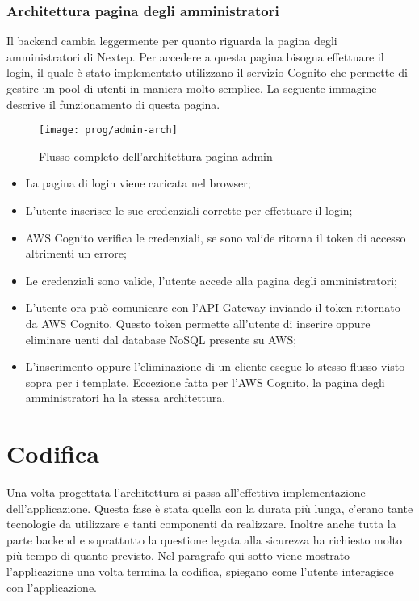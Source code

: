 \subsubsection{Architettura pagina degli amministratori}
Il backend cambia leggermente per quanto riguarda la pagina degli amministratori di Nextep. Per accedere a questa pagina bisogna effettuare il login, il quale è stato implementato utilizzano il servizio Cognito che permette di gestire un pool di utenti in maniera molto semplice. La seguente immagine descrive il funzionamento di questa pagina. 
\begin{figure}[!h] 
	\centering 
	\texttt{[image: prog/admin-arch]} 
	\caption{Flusso completo dell'architettura pagina admin}
\end{figure} 
\begin{itemize}
	\item La pagina di login viene caricata nel browser;
	\item L'utente inserisce le sue credenziali corrette per effettuare il login;
	\item AWS Cognito verifica le credenziali, se sono valide ritorna il token di accesso altrimenti un errore;
	\item Le credenziali sono valide, l'utente accede alla pagina degli amministratori;
	\item L'utente ora può comunicare con l'API Gateway inviando il token ritornato da AWS Cognito. Questo token permette all'utente di inserire oppure eliminare uenti dal database NoSQL presente su AWS;
	\item L'inserimento oppure l'eliminazione di un cliente esegue lo stesso flusso visto sopra per i template. Eccezione fatta per l'AWS Cognito, la pagina degli amministratori ha la stessa architettura.
\end{itemize}
\newpage
\section{Codifica}

Una volta progettata l’architettura 
si passa all’effettiva implementazione dell'applicazione.
 Questa fase è stata quella con la durata più lunga, c'erano tante tecnologie da utilizzare e tanti componenti da realizzare. Inoltre anche tutta la parte backend e soprattutto la questione legata alla sicurezza ha richiesto molto più tempo di quanto previsto. Nel paragrafo qui sotto viene mostrato l'applicazione una volta termina la codifica, spiegano come l'utente interagisce con l'applicazione. 

